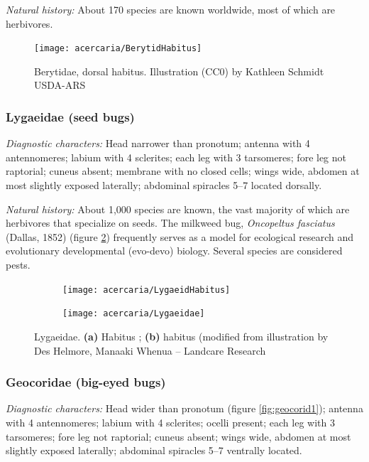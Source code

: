 \noindent{}\textit{Natural history:} About 170 species are known worldwide, most of which are herbivores.\vspace{3mm}

\begin{figure}[ht!]
 \centering
 \texttt{[image: acercaria/BerytidHabitus]}
 \caption{Berytidae, dorsal habitus. Illustration (CC0) by Kathleen Schmidt USDA-ARS}
 \label{fig:berytid1}
\end{figure}

\subsubsection{Lygaeidae (seed bugs)}%
\noindent{}\textit{Diagnostic characters:} Head narrower than pronotum; antenna with 4 antennomeres; labium with 4 sclerites; each leg with 3 tarsomeres; fore leg not raptorial; cuneus absent; membrane with no closed cells; wings wide, abdomen at most slightly exposed laterally; abdominal spiracles 5--7 located dorsally.\vspace{3mm}

\noindent{}\textit{Natural history:} About 1,000 species are known, the vast majority of which are herbivores that specialize on seeds. The milkweed bug, \textit{Oncopeltus fasciatus} (Dallas, 1852) (figure \ref{fig:oncopeltus}) frequently serves as a model for ecological research and evolutionary developmental (evo-devo) biology. Several species are considered pests.\vspace{3mm}

\begin{figure}[ht!]
 \centering
 \begin{subfigure}[ht!]{0.45\textwidth}
  \texttt{[image: acercaria/LygaeidHabitus]}
  \caption{}
  \label{fig:oncopeltus}
 \end{subfigure}
 \hfill
 \begin{subfigure}[ht!]{0.45\textwidth}
  \texttt{[image: acercaria/Lygaeidae]}
  \caption{}
  \label{fig:lygaeid}
 \end{subfigure}
 \caption{Lygaeidae. \textbf{(a)} Habitus \citep[redrawn from][Plate 16, Fig. 23]{bhl14630}; \textbf{(b)} habitus (modified from illustration by Des Helmore, Manaaki Whenua – Landcare Research}\label{fig:lygaeid1}
\end{figure}

\subsubsection{Geocoridae (big-eyed bugs)}
\noindent{}\textit{Diagnostic characters:} Head wider than pronotum (figure \ref{fig:geocorid1}); antenna with 4 antennomeres; labium with 4 sclerites; ocelli present; each leg with 3 tarsomeres; fore leg not raptorial; cuneus absent; wings wide, abdomen at most slightly exposed laterally; abdominal spiracles 5--7 ventrally located.\vspace{3mm}


